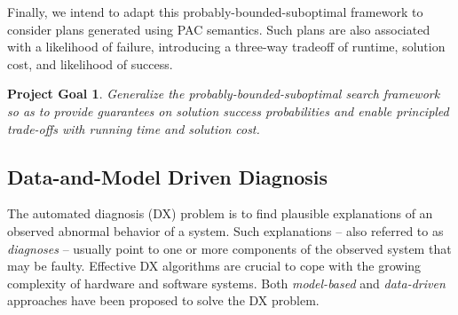 \documentclass[12pt]{article}
\newtheorem{problem}{Project Goal}
\begin{document}
Finally, we intend to adapt this probably-bounded-suboptimal framework to consider plans generated using PAC semantics. Such plans are also associated with a likelihood of failure, introducing a three-way tradeoff of runtime, solution cost, and likelihood of success. 
\begin{problem}
Generalize the probably-bounded-suboptimal search framework so as to provide guarantees on solution success probabilities and enable principled trade-offs with running time and solution cost. 
\end{problem}


\subsection{Data-and-Model Driven Diagnosis}



The automated diagnosis (DX) problem is to find plausible explanations of an observed abnormal behavior of a system. Such explanations -- also referred to as {\em diagnoses} -- usually point to one or more components of the observed system that may be faulty. 
Effective DX algorithms are crucial to cope with the growing complexity of hardware and software systems. 
Both  {\em model-based} and {\em data-driven} approaches have been proposed to solve the DX problem. 
\end{document}
